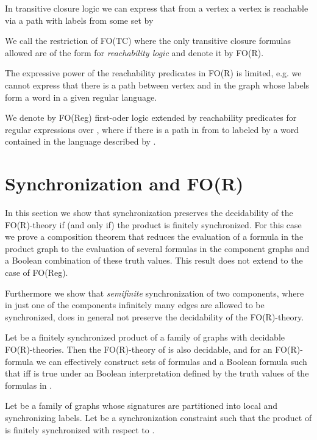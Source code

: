 \documentclass{LMCS}
\begin{document}
In transitive closure logic we can express that from a vertex
 a vertex  is reachable via a path with labels from some set 
 by 
 

We call the restriction of FO(TC) where the only transitive closure formulas allowed are
of the form  for   \emph{reachability logic} 
and denote it by FO(R).

 The expressive power of the reachability predicates in FO(R) is limited, 
 e.g. we cannot express that there is a path between vertex  and  in 
 the graph whose labels form a word in a given regular language. 

 We denote by FO(Reg) first-oder logic extended by reachability predicates 
  for regular expressions  over , where 
  if there is a path in  from  to 
 labeled by a word contained in the language described by .






\section{Synchronization and FO(R)}

In this section we show that synchronization preserves the decidability 
of the FO(R)-theory if (and only if) the product is finitely synchronized.
For this case we prove a composition theorem that reduces the evaluation
of a formula in the product graph to the evaluation of several formulas in
the component graphs and a Boolean combination of these truth values.
This result does not extend to the case of FO(Reg).

Furthermore we show that \emph{semifinite} synchronization of two components,
where in just  one of the components infinitely many edges are allowed to
be synchronized, does in general not preserve the decidability of the FO(R)-theory.

\begin{thm}\label{theo:compos}
Let  be a finitely synchronized product of a family  of graphs 
with decidable FO(R)-theories. Then the FO(R)-theory of  is also decidable, and for an
FO(R)-formula  we can effectively construct sets of formulas  and a Boolean 
formula  such that  iff  is true under an Boolean interpretation
defined by the truth values of the formulas in .
\end{thm}

\proof
Let  be a family of graphs whose signatures 
 are partitioned into local and synchronizing labels.  
Let  be a synchronization constraint
such that the product  of  is finitely synchronized with respect
to .
\end{document}
